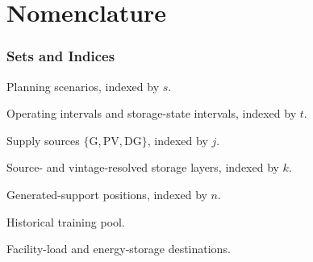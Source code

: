 \documentclass[times]{elsarticle}
\newenvironment{manuscriptdescription}
  {\begin{description}[style=multiline,leftmargin=4.8cm,labelwidth=4.5cm,align=left]}
  {\end{description}}
\begin{document}
\section*{Nomenclature}

\subsubsection*{Sets and Indices}
\begin{manuscriptdescription}
\item[$\mathcal S$] Planning scenarios, indexed by $s$.
\item[$\mathcal T,\mathcal T^+$] Operating intervals and storage-state intervals,
indexed by $t$.
\item[$\mathcal J$] Supply sources $\{\mathrm{G},\mathrm{PV},\mathrm{DG}\}$,
indexed by $j$.
\item[$\mathcal K$] Source- and vintage-resolved storage layers, indexed by $k$.
\item[$\mathcal I$] Generated-support positions, indexed by $n$.
\item[$\mathcal D^{\mathrm{tr}}$] Historical training pool.
\item[$\mathrm L,\mathrm{ES}$] Facility-load and energy-storage destinations.
\end{manuscriptdescription}
\end{document}
